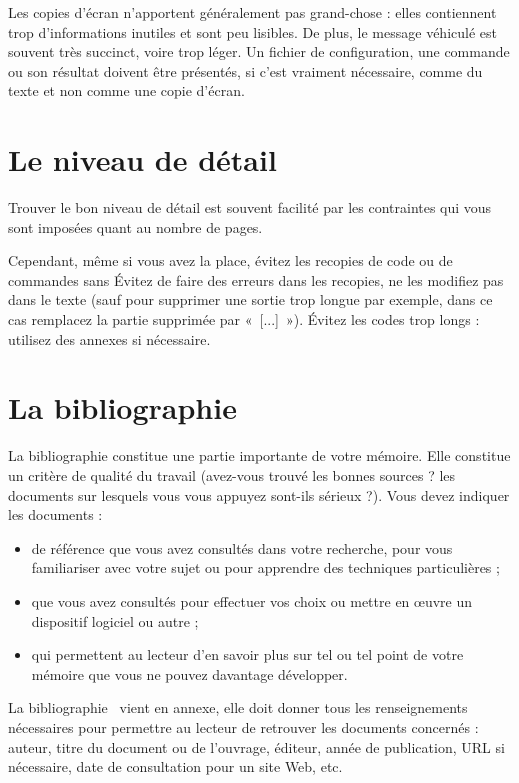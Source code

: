 \documentclass [twoside,openright,a4paper,11pt,french] {report}
\begin{document}
Les copies d'écran n'apportent généralement pas grand-chose : elles
contiennent trop d'informations inutiles et sont peu lisibles. De plus,
le message véhiculé est souvent très succinct, voire trop léger. Un
fichier de configuration, une commande ou son résultat doivent être
présentés, si c'est vraiment nécessaire, comme du texte et non comme
une copie d'écran.

\section {Le niveau de détail}

Trouver le bon niveau de détail est souvent facilité par les contraintes
qui vous sont imposées quant au nombre de pages.

Cependant, même si vous avez la place, évitez les recopies de code ou
de commandes sans Évitez de faire des erreurs dans les recopies, ne les
modifiez pas dans le texte (sauf pour supprimer une sortie trop longue
par exemple, dans ce cas remplacez la partie supprimée par «~[...]~»).
Évitez les codes trop longs : utilisez des annexes si nécessaire.


\section {La bibliographie}

La bibliographie constitue une partie importante de votre mémoire.
Elle constitue un critère de qualité du travail (avez-vous trouvé les
bonnes sources ? les documents sur lesquels vous vous appuyez sont-ils
sérieux ?). Vous devez indiquer les documents :

\begin {itemize}
    \item de référence que vous avez consultés dans votre recherche,
	pour vous familiariser avec votre sujet ou pour apprendre
	des techniques particulières ;
    \item que vous avez consultés pour effectuer vos choix ou mettre
	en œuvre un dispositif logiciel ou autre ;
    \item qui permettent au lecteur d'en savoir plus sur tel ou tel
	point de votre mémoire que vous ne pouvez davantage développer.
\end {itemize}

La bibliographie~\cite {savoirs2010} vient en annexe, elle doit donner
tous les renseignements nécessaires pour permettre au lecteur de
retrouver les documents concernés : auteur, titre du document ou de
l'ouvrage, éditeur, année de publication, URL si nécessaire, date de
consultation pour un site Web, etc.
\end{document}
